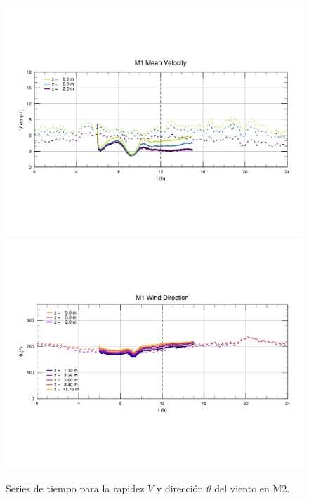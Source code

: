 \vspace*{\fill}
\begin{figure}[H]
	\centering
	\includegraphics[width=0.87\linewidth,page=2,trim={9mm 57mm 10mm 60mm},clip]{Imagenes/06/bol/ts_interpol_compare.pdf}\\%
	\includegraphics[width=0.87\linewidth,page=2,trim={12mm 52mm 10mm 60mm},clip]{Imagenes/06/bol/ts_interpol_compare_o.pdf}%
	\vspace{-2mm}\caption{Series de tiempo para la rapidez $V$ y dirección $\theta$ del viento en M2.}
	\label{fig:06_bol_ts_m2}
\end{figure}
\vspace*{\fill}
\newpage
\vspace*{\fill}
